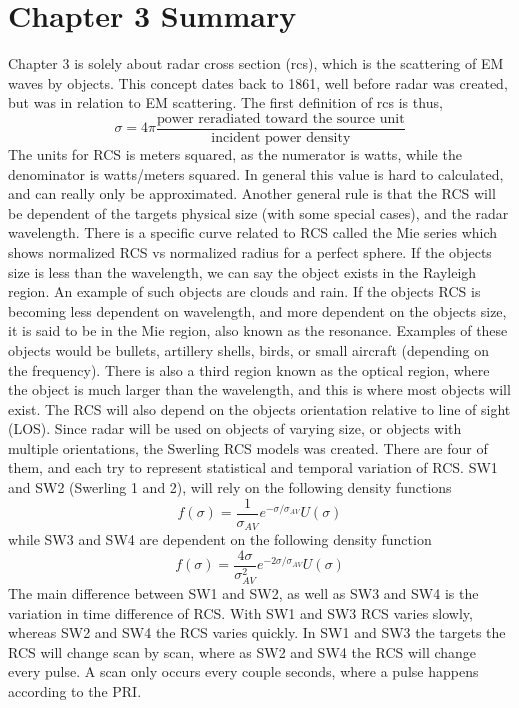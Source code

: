 \documentclass[12pt]{article}
\begin{document}
\section{Chapter 3 Summary}
Chapter 3 is solely about radar cross section (rcs), which is the scattering of EM waves by objects. This concept dates back to 1861, well before radar was created, but was in relation to EM scattering. The first definition of rcs is thus, 
\begin{equation}
    \sigma = 4 \pi \frac{ \mbox{power reradiated toward the source unit} }{ \mbox{incident power density}}
\end{equation}
The units for RCS is meters squared, as the numerator is watts, while the denominator is watts/meters squared. In general this value is hard to calculated, and can really only be approximated. Another general rule is that the RCS will be dependent of the targets physical size (with some special cases), and the radar wavelength. There is a specific curve related to RCS called the Mie series which shows normalized RCS vs normalized radius for a perfect sphere. 
If the objects size is less than the wavelength, we can say the object exists in the Rayleigh region. An example of such objects are clouds and rain. If the objects RCS is becoming less dependent on wavelength, and more dependent on the objects size, it is said to be in the Mie region, also known as the resonance. Examples of these objects would be bullets, artillery shells, birds, or small aircraft (depending on the frequency). There is also a third region known as the optical region, where the object is much larger than the wavelength, and this is where most objects will exist. 
The RCS will also depend on the objects orientation relative to line of sight (LOS). Since radar will be used on objects of varying size, or objects with multiple orientations, the Swerling RCS models was created. There are four of them, and each try to represent statistical and temporal variation of RCS. SW1 and SW2 (Swerling 1 and 2), will rely on the following density functions
\begin{equation}
    f (\sigma) = \frac{1}{\sigma_{AV}} e^{-\sigma / \sigma_{AV}} U(\sigma)
\end{equation}
while SW3 and SW4 are dependent on the following density function
\begin{equation}
    f (\sigma) = \frac{4 \sigma}{\sigma^2_{AV}} e^{-2\sigma / \sigma_{AV}} U(\sigma)
\end{equation}
The main difference between SW1 and SW2, as well as SW3 and SW4 is the variation in time difference of RCS. With SW1 and SW3 RCS varies slowly, whereas SW2 and SW4 the RCS varies quickly. In SW1 and SW3 the targets the RCS will change scan by scan, where as SW2 and SW4 the RCS will change every pulse. A scan only occurs every couple seconds, where a pulse happens according to the PRI.
\end{document}
